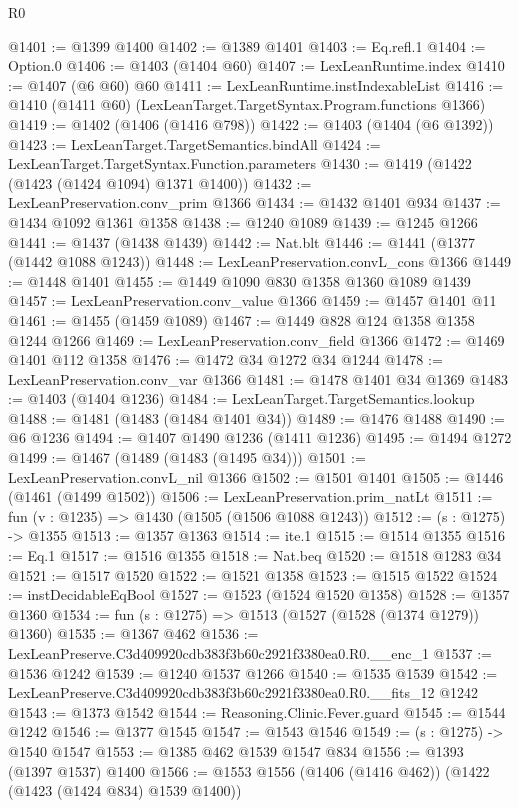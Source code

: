 \begin{lexlean}{R0}
\begin{coremodule}
@1401 := @1399 @1400
@1402 := @1389 @1401
@1403 := Eq.refl.{1}
@1404 := Option.{0}
@1406 := @1403 (@1404 @60)
@1407 := LexLeanRuntime.index
@1410 := @1407 (@6 @60) @60
@1411 := LexLeanRuntime.instIndexableList
@1416 := @1410 (@1411 @60) (LexLeanTarget.TargetSyntax.Program.functions @1366)
@1419 := @1402 (@1406 (@1416 @798))
@1422 := @1403 (@1404 (@6 @1392))
@1423 := LexLeanTarget.TargetSemantics.bindAll
@1424 := LexLeanTarget.TargetSyntax.Function.parameters
@1430 := @1419 (@1422 (@1423 (@1424 @1094) @1371 @1400))
@1432 := LexLeanPreservation.conv_prim @1366
@1434 := @1432 @1401 @934
@1437 := @1434 @1092 @1361 @1358
@1438 := @1240 @1089
@1439 := @1245 @1266
@1441 := @1437 (@1438 @1439)
@1442 := Nat.blt
@1446 := @1441 (@1377 (@1442 @1088 @1243))
@1448 := LexLeanPreservation.convL_cons @1366
@1449 := @1448 @1401
@1455 := @1449 @1090 @830 @1358 @1360 @1089 @1439
@1457 := LexLeanPreservation.conv_value @1366
@1459 := @1457 @1401 @11
@1461 := @1455 (@1459 @1089)
@1467 := @1449 @828 @124 @1358 @1358 @1244 @1266
@1469 := LexLeanPreservation.conv_field @1366
@1472 := @1469 @1401 @112 @1358
@1476 := @1472 @34 @1272 @34 @1244
@1478 := LexLeanPreservation.conv_var @1366
@1481 := @1478 @1401 @34 @1369
@1483 := @1403 (@1404 @1236)
@1484 := LexLeanTarget.TargetSemantics.lookup
@1488 := @1481 (@1483 (@1484 @1401 @34))
@1489 := @1476 @1488
@1490 := @6 @1236
@1494 := @1407 @1490 @1236 (@1411 @1236)
@1495 := @1494 @1272
@1499 := @1467 (@1489 (@1483 (@1495 @34)))
@1501 := LexLeanPreservation.convL_nil @1366
@1502 := @1501 @1401
@1505 := @1446 (@1461 (@1499 @1502))
@1506 := LexLeanPreservation.prim_natLt
@1511 := fun (v : @1235) => @1430 (@1505 (@1506 @1088 @1243))
@1512 := (s : @1275) -> @1355
@1513 := @1357 @1363
@1514 := ite.{1}
@1515 := @1514 @1355
@1516 := Eq.{1}
@1517 := @1516 @1355
@1518 := Nat.beq
@1520 := @1518 @1283 @34
@1521 := @1517 @1520
@1522 := @1521 @1358
@1523 := @1515 @1522
@1524 := instDecidableEqBool
@1527 := @1523 (@1524 @1520 @1358)
@1528 := @1357 @1360
@1534 := fun (s : @1275) => @1513 (@1527 (@1528 (@1374 @1279)) @1360)
@1535 := @1367 @462
@1536 := LexLeanPreserve.C3d409920cdb383f3b60c2921f3380ea0.R0.__enc_1
@1537 := @1536 @1242
@1539 := @1240 @1537 @1266
@1540 := @1535 @1539
@1542 := LexLeanPreserve.C3d409920cdb383f3b60c2921f3380ea0.R0.__fits_12 @1242
@1543 := @1373 @1542
@1544 := Reasoning.Clinic.Fever.guard
@1545 := @1544 @1242
@1546 := @1377 @1545
@1547 := @1543 @1546
@1549 := (s : @1275) -> @1540 @1547
@1553 := @1385 @462 @1539 @1547 @834
@1556 := @1393 (@1397 @1537) @1400
@1566 := @1553 @1556 (@1406 (@1416 @462)) (@1422 (@1423 (@1424 @834) @1539 @1400))

\end{coremodule}
\end{lexlean}
